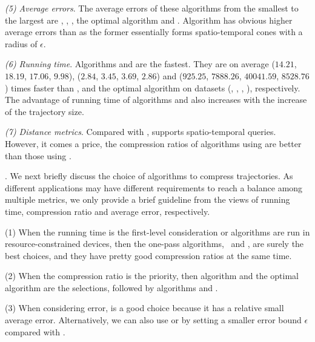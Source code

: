 {\sstab\emph{(5) Average errors}. The average errors of these algorithms from the smallest to the largest are \squishe, \dps, \cist, the optimal \lsa algorithm and \cista. Algorithm \cista has obvious higher average errors than \cist as the former essentially forms spatio-temporal cones with a radius of $\epsilon$.

\sstab\emph{(6) Running time}. Algorithms \cist and \cista are the fastest. They are on average
($14.21$, $18.19$, $17.06$, $9.98$), ($2.84$, $3.45$, $3.69$, $2.86$) and ($925.25$, $7888.26$, $40041.59$, $8528.76$) times faster than \dps, \squishe and the optimal \lsa algorithm on datasets (\sercar, \geolife, \mopsi, \pricar), respectively.
The advantage of running time of algorithms \cist and \cista also increases  with the increase of the trajectory size.


\sstab \emph{(7) Distance metrics}. Compared with \ped, \sed supports  spatio-temporal queries. However, it comes a price, \eg  the compression ratios of algorithms using \ped are better than those using \sed.}


. We next briefly discuss the choice of algorithms to compress trajectories.
As different applications may have different requirements to reach a balance among multiple metrics, we only provide a brief guideline from the views of running time, compression ratio and average error, respectively.

\sstab(1) When the running time is the first-level consideration or algorithms are run in resource-constrained devices, then the one-pass algorithms, \ie~\cist and \cista, are surely the best choices, and they have pretty good compression ratios at the same time.

\sstab(2) When the compression ratio is the priority, then algorithm \cista and the optimal algorithm are the selections, followed by algorithms \dps and \cist.

\sstab(3) When considering error, \squishe is a good choice because it has a relative small average error. Alternatively, we can also use \dps or \cist by setting a smaller error bound $\epsilon$ compared with \squishe.




